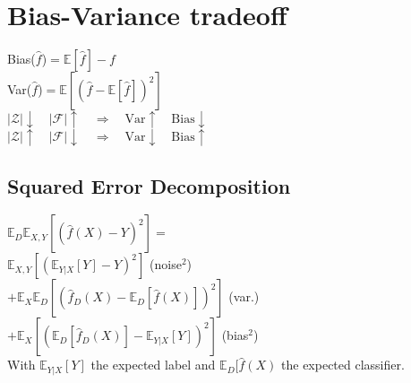 \section*{Bias-Variance tradeoff}
Bias($\hat{f}$)$=\mathbb{E}[\hat{f}]-f$\\
Var($\hat{f}$)$=\mathbb{E}[(\hat{f}-\mathbb{E}[\hat{f}])^2]$\\
$|\mathcal{Z}|\downarrow \quad|\mathcal{F}|\uparrow\quad\Rightarrow\quad\mathrm{Var}\uparrow\quad\mathrm{Bias}\downarrow $\\
$|\mathcal{Z}|\uparrow \quad|\mathcal{F}|\downarrow\quad\Rightarrow\quad\mathrm{Var}\downarrow\quad\mathrm{Bias}\uparrow $

\subsection*{Squared Error Decomposition}
$\mathbb{E}_D\mathbb{E}_{X,Y}[(\hat{f}(X)-Y)^2]=$\\
$\mathbb{E}_{X,Y}[(\mathbb{E}_{Y|X}[Y]-Y)^2]$ (noise$^2$)\\
$+\mathbb{E}_X\mathbb{E}_D[(\hat{f}_D(X)-\mathbb{E}_D[\hat{f}(X)])^2]$ (var.)\\
$+\mathbb{E}_X[(\mathbb{E}_D[\hat{f}_D(X)]-\mathbb{E}_{Y|X}[Y])^2]$ (bias$^2$)\\
With $\mathbb{E}_{Y|X}[Y]$ the expected label and $\mathbb{E}_{D}[\hat{f}(X)$ the expected classifier.